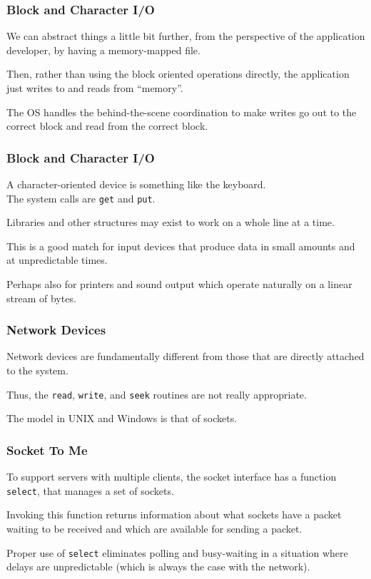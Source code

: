 \begin{frame}
\frametitle{Block and Character I/O}

We can abstract things a little bit further, from the perspective of the application developer, by having a memory-mapped file. 

Then, rather than using the block oriented operations directly, the application just writes to and reads from ``memory''.

The OS handles the behind-the-scene coordination to make writes go out to the correct block and read from the correct block.


\end{frame}

\begin{frame}
\frametitle{Block and Character I/O}

A character-oriented device is something like the keyboard.\\
\quad The system calls are \texttt{get} and \texttt{put}. 

Libraries and other structures may exist to work on a whole line at a time.

This is a good match for input devices that produce data in small amounts and at unpredictable times. 

Perhaps also for printers and sound output which operate naturally on a linear stream of bytes.

\end{frame}

\begin{frame}
\frametitle{Network Devices}

Network devices are fundamentally different from those that are directly attached to the system. 

Thus, the \texttt{read}, \texttt{write}, and \texttt{seek} routines are not really appropriate. 

The model in UNIX and Windows is that of \alert{sockets}.


\end{frame}


\begin{frame}
\frametitle{Socket To Me}

To support servers with multiple clients, the socket interface has a function \texttt{select}, that manages a set of sockets. 

Invoking this function returns information about what sockets have a packet waiting to be received and which are available for sending a packet. 

Proper use of \texttt{select} eliminates polling and busy-waiting in a situation where delays are unpredictable (which is always the case with the network).


\end{frame}

